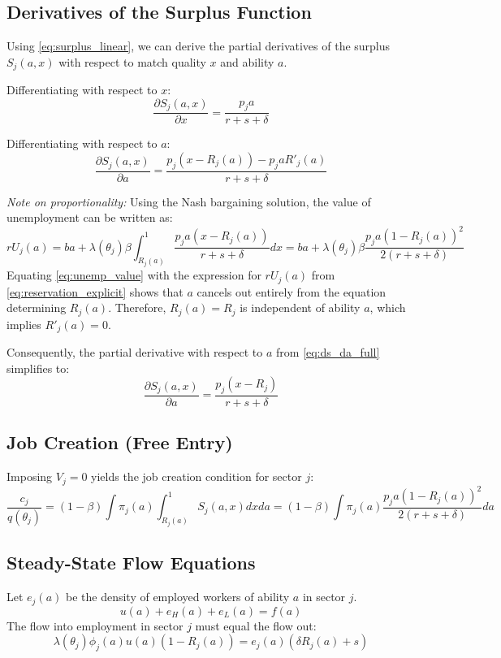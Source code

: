 \documentclass[11pt]{article}
\begin{document}
\subsection{Derivatives of the Surplus Function}
Using \eqref{eq:surplus_linear}, we can derive the partial derivatives of the surplus $S_j(a, x)$ with respect to match quality $x$ and ability $a$.

Differentiating with respect to $x$:
\begin{equation}
\frac{\partial S_j(a, x)}{\partial x} = \frac{p_j a}{r + s + \delta}
\end{equation}

Differentiating with respect to $a$:
\begin{equation} \label{eq:ds_da_full}
\frac{\partial S_j(a, x)}{\partial a} = \frac{p_j (x - R_j(a)) - p_j a R'_j(a)}{r + s + \delta}
\end{equation}

\textit{Note on proportionality:} Using the Nash bargaining solution, the value of unemployment can be written as:
\begin{equation} \label{eq:unemp_value}
r U_j(a) = b a + \lambda(\theta_j) \beta \int_{R_j(a)}^1 \frac{p_j a (x - R_j(a))}{r + s + \delta} dx = b a + \lambda(\theta_j) \beta \frac{p_j a (1 - R_j(a))^2}{2(r + s + \delta)}
\end{equation}
Equating \eqref{eq:unemp_value} with the expression for $r U_j(a)$ from \eqref{eq:reservation_explicit} shows that $a$ cancels out entirely from the equation determining $R_j(a)$. Therefore, $R_j(a) = R_j$ is independent of ability $a$, which implies $R'_j(a) = 0$.

Consequently, the partial derivative with respect to $a$ from \eqref{eq:ds_da_full} simplifies to:
\begin{equation}
\frac{\partial S_j(a, x)}{\partial a} = \frac{p_j (x - R_j)}{r + s + \delta}
\end{equation}

\subsection{Job Creation (Free Entry)}
Imposing $V_j = 0$ yields the job creation condition for sector $j$:
\begin{equation}
\frac{c_j}{q(\theta_j)} = (1-\beta) \int \pi_j(a) \int_{R_j(a)}^1 S_j(a, x) dx da = (1-\beta) \int \pi_j(a) \frac{p_j a (1 - R_j(a))^2}{2(r + s + \delta)} da
\end{equation}

\subsection{Steady-State Flow Equations}
Let $e_j(a)$ be the density of employed workers of ability $a$ in sector $j$.
\begin{equation}
u(a) + e_H(a) + e_L(a) = f(a)
\end{equation}
The flow into employment in sector $j$ must equal the flow out:
\begin{equation}
\lambda(\theta_j) \phi_j(a) u(a) (1 - R_j(a)) = e_j(a) (\delta R_j(a) + s)
\end{equation}
\end{document}
